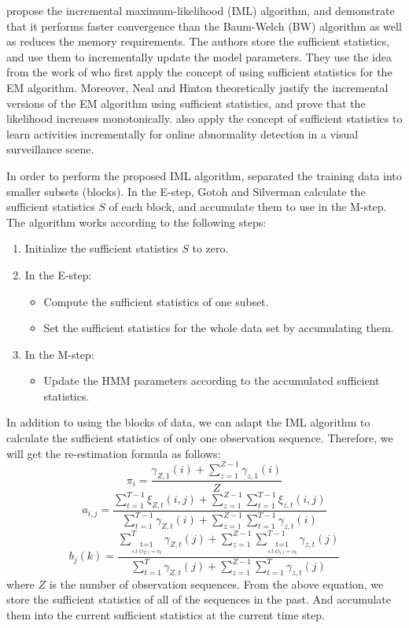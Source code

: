  propose the incremental
maximum-likelihood (IML) algorithm, and demonstrate that it performs
faster convergence than the Baum-Welch (BW) algorithm as well as
reduces the memory requirements. The authors store the sufficient
statistics, and use them to incrementally update the model
parameters. They use the idea from the work of 
who first apply the concept of using sufficient statistics for the EM
algorithm. Moreover, Neal and Hinton theoretically justify the
incremental versions of the EM algorithm using sufficient statistics,
and prove that the likelihood increases
monotonically.  also apply the concept
of sufficient statistics to learn activities incrementally for online
abnormality detection in a visual surveillance scene.

In order to perform the proposed IML
algorithm,  separated the training data
into smaller subsets (blocks). In the E-step, Gotoh and Silverman
calculate the sufficient statistics $S$ of each block, and accumulate
them to use in the M-step. The algorithm works according to the
following steps:

\begin{enumerate}
  \item Initialize the sufficient statistics $S$ to zero.
  \item In the E-step:
  \begin{itemize}
    \item Compute the sufficient statistics of one subset.
    \item Set the sufficient statistics for the whole data set by accumulating them.
  \end{itemize}
  \item In the M-step:
  \begin{itemize}
    \item Update the HMM parameters according to the accumulated sufficient statistics.
  \end{itemize}
\end{enumerate}

In addition to using the blocks of data, we can adapt the IML
algorithm to calculate the sufficient statistics of only one
observation sequence. Therefore, we will get the re-estimation formula
as follows:
\[
	\pi _i  = \frac{{\gamma _{Z,1} (i) + \sum\limits_{z = 1}^{Z - 1} 
	{\gamma_{z,1} (i)} }}{Z}
\]
\[
	a_{i,j}  = \frac{{\sum\limits_{t = 1}^{T - 1} {\xi _{Z,t} (i,j)}  + 
	\sum\limits_{z = 1}^{Z - 1}{\sum\limits_{t = 1}^{T - 1}{\xi _{z,t}(i,j)} } 
	}}{{\sum\limits_{t = 1}^{T - 1}{\gamma _{Z,t}(i)}+\sum\limits_{z = 1}^{Z-1} 
	{\sum\limits_{t = 1}^{T - 1} {\gamma _{z,t} (i)} } }}
\]
\[
	b_j (k) = \frac{{\sum\limits_{\mathop {t = 1}\limits_{s.t.O_{Z,t}=v_k } }^T 
	{\gamma _{Z,t} (j)}  + \sum\limits_{z = 1}^{Z - 1}{\sum\limits_{\mathop 
	{t=1}\limits_{s.t.O_{z,t}=v_k}}^{T - 1}{\gamma _{z,t} (j)}} 
	}}{{\sum\limits_{t = 1}^T {\gamma _{Z,t} (j)}  + \sum\limits_{z = 1}^{Z - 1} 
	{\sum\limits_{t = 1}^T {\gamma _{z,t} (j)} } }}
\]
where $Z$ is the number of observation sequences. From the above
equation, we store the sufficient statistics of all of the sequences
in the past. And accumulate them into the current sufficient
statistics at the current time step.

